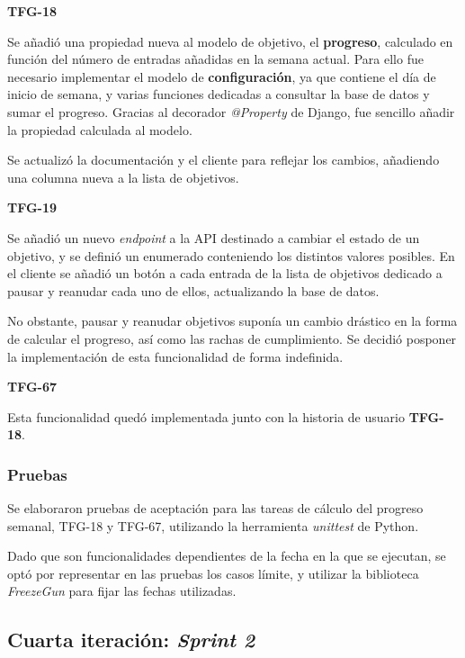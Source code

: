 \documentclass[10pt, a4paper]{aqademic}
\begin{document}
\medskip

\textbf{TFG-18}

Se añadió una propiedad nueva al modelo de objetivo, el \textbf{progreso}, calculado en función del número de entradas añadidas en la semana actual. Para ello fue necesario implementar el modelo de \textbf{configuración}, ya que contiene el día de inicio de semana, y varias funciones dedicadas a consultar la base de datos y sumar el progreso. Gracias al decorador \textit{@Property} de Django, fue sencillo añadir la propiedad calculada al modelo.

Se actualizó la documentación y el cliente para reflejar los cambios, añadiendo una columna nueva a la lista de objetivos.

\medskip

\textbf{TFG-19}

Se añadió un nuevo \textit{endpoint} a la API destinado a cambiar el estado de un objetivo, y se definió un enumerado conteniendo los distintos valores posibles. En el cliente se añadió un botón a cada entrada de la lista de objetivos dedicado a pausar y reanudar cada uno de ellos, actualizando la base de datos.

No obstante, pausar y reanudar objetivos suponía un cambio drástico en la forma de calcular el progreso, así como las rachas de cumplimiento. Se decidió posponer la implementación de esta funcionalidad de forma indefinida.

\medskip

\textbf{TFG-67}

Esta funcionalidad quedó implementada junto con la historia de usuario \textbf{TFG-18}.


\subsubsection{Pruebas}

Se elaboraron pruebas de aceptación para las tareas de cálculo del progreso semanal, TFG-18 y TFG-67, utilizando la herramienta \textit{unittest} de Python.

Dado que son funcionalidades dependientes de la fecha en la que se ejecutan, se optó por representar en las pruebas los casos límite, y utilizar la biblioteca \textit{FreezeGun} \cite{pulec_freezegun_nodate} para fijar las fechas utilizadas.


\subsection{Cuarta iteración: \textit{Sprint 2}}
\end{document}
